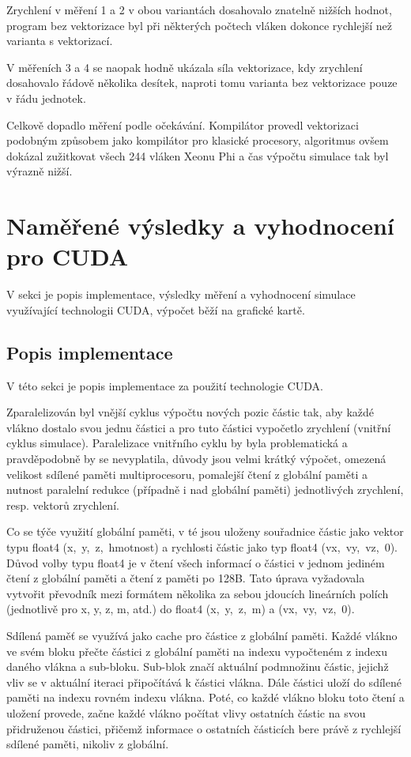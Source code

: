 \documentclass[12pt]{article}
\begin{document}
Zrychlení v měření 1 a 2 v obou variantách dosahovalo znatelně nižších hodnot,
program bez vektorizace byl při některých počtech vláken dokonce rychlejší než varianta s vektorizací.

V měřeních 3 a 4 se naopak hodně ukázala síla vektorizace, kdy zrychlení dosahovalo řádově několika desítek, naproti tomu varianta bez vektorizace pouze v řádu jednotek.

Celkově dopadlo měření podle očekávání.
Kompilátor provedl vektorizaci podobným způsobem jako kompilátor pro klasické procesory, algoritmus ovšem dokázal zužitkovat všech 244 vláken Xeonu Phi a čas výpočtu simulace tak byl výrazně nižší.

\section{Naměřené výs\-led\-ky a vyhod\-noce\-ní pro CUDA}
V sekci je popis implementace, výsledky měření a vyhodnocení simulace využívající technologii CUDA, výpočet běží na grafické kartě.

\subsection{Popis implementace}
V této sekci je popis implementace za použití technologie CUDA.

Zparalelizován byl vnější cyklus výpočtu nových pozic částic tak,
aby každé vlákno dostalo svou jednu částici a
pro tuto částici vypočetlo zrychlení
(vnitřní cyklus simulace).
Paralelizace vnitřního cyklu by byla problematická a pravděpodobně by se nevyplatila, důvody jsou velmi krátký výpočet, omezená velikost sdílené paměti multiprocesoru,
pomalejší čtení z globální paměti a nutnost paralelní redukce (případně i nad globální paměti) jednotlivých zrychlení, resp. vektorů zrychlení.

Co se týče využití globální paměti, v té jsou uloženy souřadnice částic jako vektor typu float4 (x,~y,~z,~hmotnost) a rychlosti částic jako typ float4 (vx,~vy,~vz,~0).
Důvod volby typu float4 je v čtení všech informací o částici v jednom jediném čtení z globální paměti a čtení z paměti po 128B.
Tato úprava vyžadovala vytvořit převodník mezi formátem několika za sebou jdoucích lineárních polích (jednotlivě pro x, y, z, m, atd.) do float4 (x,~y,~z,~m) a (vx,~vy,~vz,~0).

Sdílená paměť se využívá jako cache pro částice z globální paměti.
Každé vlákno ve svém bloku přečte částici z globální paměti na indexu vypočteném z indexu daného vlákna a sub-bloku.
Sub-blok značí aktuální podmnožinu částic, jejichž vliv se v aktuální iteraci připočítává k částici vlákna.
Dále částici uloží do sdílené paměti na indexu rovném indexu vlákna.
Poté, co každé vlákno bloku toto čtení a uložení provede, začne každé vlákno počítat vli\-vy os\-tat\-ních čás\-tic na svou přidruženou částici,
přičemž informace o os\-tat\-ních čás\-ticích bere právě z rychlejší sdílené paměti, nikoliv z globální.
\end{document}
